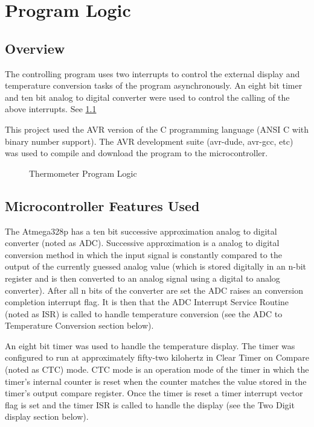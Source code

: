 \documentclass[a4paper]{article}
\begin{document}
\chapter{Program Logic} 
	\section{Overview}
	The controlling program uses two interrupts to control the external display and
	temperature conversion tasks of the program asynchronously. An eight bit timer
	and ten bit analog to digital converter were used to control the calling of the
	above interrupts. See \ref{fig:progLogic}
	
	This project used the AVR version of the C programming language (ANSI C with
	binary number support). The AVR development suite (avr-dude, avr-gcc, etc) was
	used to compile and download the program to the microcontroller. 

	\begin{figure}[h]
		\begin{center}
		\end{center}
		\caption{Thermometer Program Logic}
		\label{fig:progLogic}
	\end{figure}


	\section{Microcontroller Features Used}
	The Atmega328p has a ten bit successive approximation analog to digital
	converter (noted as ADC). Successive approximation is a analog to digital
	conversion method in which the input signal is constantly compared to the output
	of the currently guessed analog value (which is stored digitally in an n-bit
	register and is then converted to an analog signal using a digital to analog
	converter). After all n bits of the converter are set the ADC raises an
	conversion completion interrupt flag. It is then that the ADC Interrupt Service
	Routine (noted as ISR) is called to handle temperature conversion (see the ADC
	to Temperature Conversion section below).
	
	An eight bit timer was used to handle the temperature display. The timer was
	configured to run at approximately fifty-two kilohertz in Clear Timer on Compare
	(noted as CTC) mode. CTC mode is an operation mode of the timer in which the
	timer's internal counter is reset when the counter matches the value stored in
	the timer's output compare register. Once the timer is reset a timer interrupt
	vector flag is set and the timer ISR is called to handle the display (see the
	Two Digit display section below).
\end{document}
